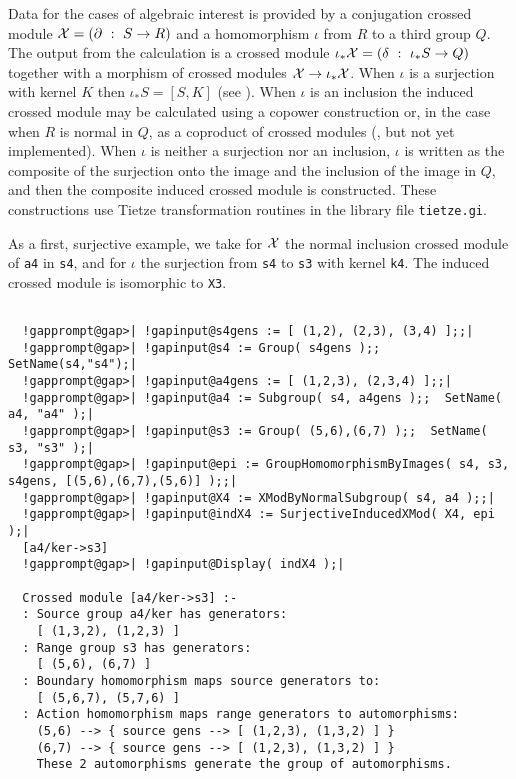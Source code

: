 \documentclass[a4paper,11pt]{report}
\begin{document}
{{{ Data for the cases of algebraic interest is provided by a conjugation crossed
module ${\cal X} = (\partial ~:~ S \to R)$ and a homomorphism $\iota$ from $R$ to a third group $Q$. The output from the calculation is a crossed module $\iota_{\ast}{\cal X} = (\delta ~:~ \iota_{\ast}S \to Q)$ together with a morphism of crossed modules ${\cal X} \to \iota_{\ast}{\cal X}$. When $\iota$ is a surjection with kernel $K$ then $\iota_{\ast}S = [S,K]$ (see \cite{BH1}). When $\iota$ is an inclusion the induced crossed module may be calculated using a copower
construction \cite{BW1} or, in the case when $R$ is normal in $Q$, as a coproduct of crossed modules (\cite{BW2}, but not yet implemented). When $\iota$ is neither a surjection nor an inclusion, $\iota$ is written as the composite of the surjection onto the image and the inclusion
of the image in $Q$, and then the composite induced crossed module is constructed. These
constructions use Tietze transformation routines in the library file \texttt{tietze.gi}. 

 As a first, surjective example, we take for ${\cal X}$ the normal inclusion crossed module of \texttt{a4} in \texttt{s4}, and for $\iota$ the surjection from \texttt{s4} to \texttt{s3} with kernel \texttt{k4}. The induced crossed module is isomorphic to \texttt{X3}. }

 
\begin{Verbatim}[commandchars=!@|,fontsize=\small,frame=single,label=Example]
  
  !gapprompt@gap>| !gapinput@s4gens := [ (1,2), (2,3), (3,4) ];;|
  !gapprompt@gap>| !gapinput@s4 := Group( s4gens );; SetName(s4,"s4");|
  !gapprompt@gap>| !gapinput@a4gens := [ (1,2,3), (2,3,4) ];;|
  !gapprompt@gap>| !gapinput@a4 := Subgroup( s4, a4gens );;  SetName( a4, "a4" );|
  !gapprompt@gap>| !gapinput@s3 := Group( (5,6),(6,7) );;  SetName( s3, "s3" );|
  !gapprompt@gap>| !gapinput@epi := GroupHomomorphismByImages( s4, s3, s4gens, [(5,6),(6,7),(5,6)] );;|
  !gapprompt@gap>| !gapinput@X4 := XModByNormalSubgroup( s4, a4 );;|
  !gapprompt@gap>| !gapinput@indX4 := SurjectiveInducedXMod( X4, epi );|
  [a4/ker->s3]
  !gapprompt@gap>| !gapinput@Display( indX4 );|
  
  Crossed module [a4/ker->s3] :- 
  : Source group a4/ker has generators:
    [ (1,3,2), (1,2,3) ]
  : Range group s3 has generators:
    [ (5,6), (6,7) ]
  : Boundary homomorphism maps source generators to:
    [ (5,6,7), (5,7,6) ]
  : Action homomorphism maps range generators to automorphisms:
    (5,6) --> { source gens --> [ (1,2,3), (1,3,2) ] }
    (6,7) --> { source gens --> [ (1,2,3), (1,3,2) ] }
    These 2 automorphisms generate the group of automorphisms.
  

\end{Verbatim}}}
\end{document}
